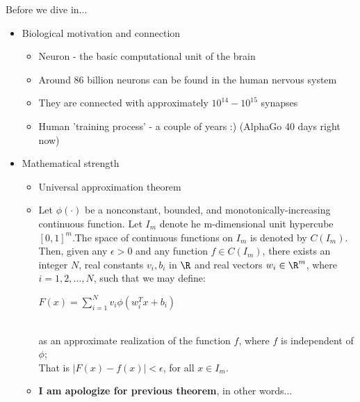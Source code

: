 \documentclass[aspectratio=169]{beamer}
\begin{document}
\begin{frame}{Before we dive in...}
    \begin{itemize}
        \item Biological motivation and connection
        \begin{itemize}
            \item Neuron - the basic computational unit of the brain
            \item Around 86 billion neurons can be found in the human nervous system 
            \item They are connected with approximately $10^14 - 10^15$ synapses
            \item Human 'training process' - a couple of years :) (AlphaGo 40 days right now)
        \end{itemize}
        \item Mathematical strength
            \begin{itemize}
                \item Universal approximation theorem
                \item Let $\phi (\cdot)$ be a nonconstant, bounded, and monotonically-increasing continuous function. Let $I_m$ denote he m-dimensional unit hypercube $[0, 1]^m$.The space of continuous functions on $I_m$ is denoted by $\textit{C}(I_m)$. Then, given any $\epsilon > 0$ and any function $f \in \textit{C}(I_m)$, there exists an integer $N$, real constants $v_i, b_i$ in $\R$ and real vectors $w_i \in {\R}^m$, where $i = 1,2, ..., N$, such that we may define: \\ \begin{center}$F(x) = \sum_{i=1}^{N}v_i \phi ( w_i^Tx + b_i)$ \end{center}\\as an approximate realization of the function $f$, where $f$ is independent of $\phi$; \\That is $|F(x)-f(x)|<\epsilon$, for all $x \in I_m$.
                \item \textbf{I am apologize for previous theorem}, in other words...
        \end{itemize}
    \end{itemize}
    
\end{frame}
\end{document}
